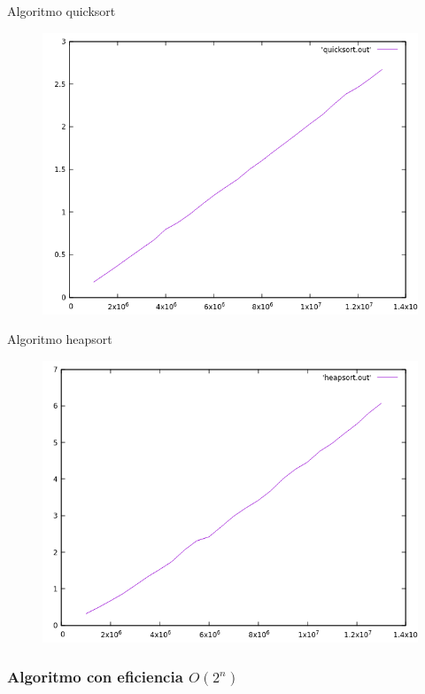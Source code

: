 \documentclass{beamer}
\begin{document}
\begin{frame}[fragile]{Algoritmo quicksort}
\begin{figure}[H]
\centering
\includegraphics[scale=0.5]{empirica_quicksort.png}
\end{figure}
\end{frame}

\begin{frame}[fragile]{Algoritmo heapsort}
\begin{figure}[H]
\centering
\includegraphics[scale=0.5]{empirica_heapsort.png}
\end{figure}
\end{frame}

\subsubsection{Algoritmo con eficiencia $O(2^n)$}
\end{document}
